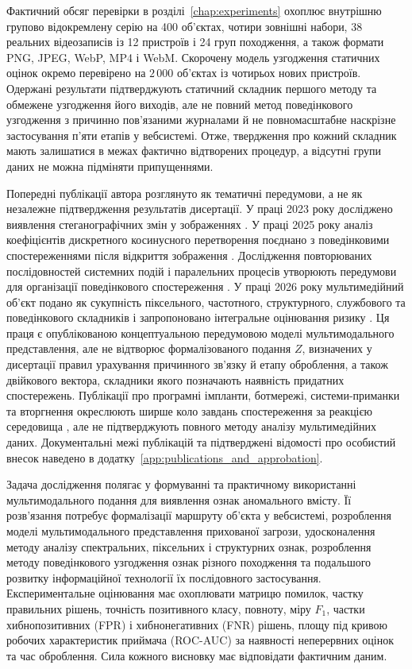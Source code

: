 Фактичний обсяг перевірки в розділі~\ref{chap:experiments} охоплює внутрішню групово відокремлену серію на 400 об’єктах, чотири зовнішні набори, 38 реальних відеозаписів із 12 пристроїв і 24 груп походження, а також формати PNG, JPEG, WebP, MP4 і WebM. Скорочену модель узгодження статичних оцінок окремо перевірено на $2\,000$ об’єктах із чотирьох нових пристроїв. Одержані результати підтверджують статичний складник першого методу та обмежене узгодження його виходів, але не повний метод поведінкового узгодження з причинно пов’язаними журналами й не повномасштабне наскрізне застосування п’яти етапів у вебсистемі. Отже, твердження про кожний складник мають залишатися в межах фактично відтворених процедур, а відсутні групи даних не можна підміняти припущеннями.

Попередні публікації автора розглянуто як тематичні передумови, а не як незалежне підтвердження результатів дисертації. У праці 2023 року досліджено виявлення стеганографічних змін у зображеннях \cite{denysiuk2023steganalysis}. У праці 2025 року аналіз коефіцієнтів дискретного косинусного перетворення поєднано з поведінковими спостереженнями після відкриття зображення \cite{denysiuk2025commands}. Дослідження повторюваних послідовностей системних подій і паралельних процесів утворюють передумови для організації поведінкового спостереження \cite{denysiuk2024behavior,denysiuk2025parallel}. У праці 2026 року мультимедійний об’єкт подано як сукупність піксельного, частотного, структурного, службового та поведінкового складників і запропоновано інтегральне оцінювання ризику \cite{denysiuk2026multimediahidden}. Ця праця є опублікованою концептуальною передумовою моделі мультимодального представлення, але не відтворює формалізованого подання $Z$, визначених у дисертації правил урахування причинного зв’язку й етапу оброблення, а також двійкового вектора, складники якого позначають наявність придатних спостережень. Публікації про програмні імпланти, ботмережі, системи-приманки та вторгнення окреслюють ширше коло завдань спостереження за реакцією середовища \cite{denysiuk2024implantscorporate,denysiuk2024botnets,denysiuk2024decoysystem,denysiuk2024systemdecoys,denysiuk2024intrusions}, але не підтверджують повного методу аналізу мультимедійних даних. Документальні межі публікацій та підтверджені відомості про особистий внесок наведено в додатку~\ref{app:publications_and_approbation}.

Задача дослідження полягає у формуванні та практичному використанні мультимодального подання для виявлення ознак аномального вмісту. Її розв’язання потребує формалізації маршруту об’єкта у вебсистемі, розроблення моделі мультимодального представлення прихованої загрози, удосконалення методу аналізу спектральних, піксельних і структурних ознак, розроблення методу поведінкового узгодження ознак різного походження та подальшого розвитку інформаційної технології їх послідовного застосування. Експериментальне оцінювання має охоплювати матрицю помилок, частку правильних рішень, точність позитивного класу, повноту, міру $F_1$, частки хибнопозитивних (FPR) і хибнонегативних (FNR) рішень, площу під кривою робочих характеристик приймача (ROC-AUC) за наявності неперервних оцінок та час оброблення. Сила кожного висновку має відповідати фактичним даним.

